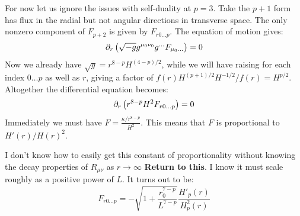 \documentclass[11pt, class=article, crop=false]{standalone}
\begin{document}
\begin{enumerate}
	
	For now let us ignore the issues with self-duality at $p=3$. Take the $p+1$ form has flux in the radial but not angular directions in transverse space.  The only nonzero component of $F_{p+2}$ is given by $F_{r 0 \dots p}$. The equation of motion gives:
	\[
		\partial_r\left(\sqrt{-g} g^{\mu_0 \nu_0} g^{\dots} F_{\mu_0 \dots} \right) = 0 
	\]
	Now we already have $\sqrt{g} = r^{8-p} H^{(4-p)/2}$, while we will have raising for each index $0 \dots p$ as well as $r$, giving a factor of $f(r) H^{(p+1)/2} H^{-1/2} / f(r) = H^{p/2}$. Altogether the differential equation becomes:
	\[
		\partial_r \left( r^{8-p} H^2 F_{r 0 \dots p} \right) = 0
	\]
	Immediately we must have $F = \frac{\kappa/r^{8-p}}{H^2}$. This means that $F$ is proportional to $H'(r)/H(r)^2$. 
	
	I don't know how to easily get this constant of proportionality without knowing the decay properties of $R_{\mu \nu}$ as $r \to \infty$ \textbf{Return to this}. I know it must scale roughly as a positive power of $L$. It turns out to be:
	\[
		F_{r 0\dots p} = - \sqrt{1+ \frac{r_0^{7-p}}{L^{7-p}}} \frac{H'_p(r)}{H^2_p(r)}
	\]
	

\end{enumerate}
\end{document}
